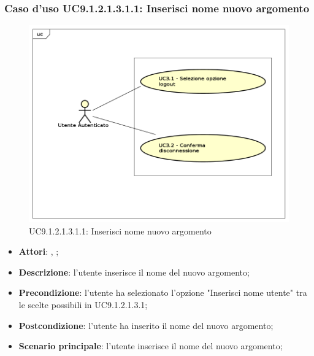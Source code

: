 							\subsubsection{Caso d'uso UC9.1.2.1.3.1.1: Inserisci nome nuovo argomento}
							\label{UC9.1.2.1.3.1.1}
							\begin{figure}[h]
								\centering
								\includegraphics[scale=0.7,keepaspectratio]{UML/UC9.png}
								\caption{UC9.1.2.1.3.1.1: Inserisci nome nuovo argomento}
							\end{figure}
							\FloatBarrier
							\begin{itemize}
								\item \textbf{Attori}: \uau, \uaupro;
								\item \textbf{Descrizione}: l'utente inserisce il nome del nuovo argomento;
								\item \textbf{Precondizione}: l'utente ha selezionato l'opzione "Inserisci nome utente" tra le scelte possibili in UC9.1.2.1.3.1;
								\item \textbf{Postcondizione}: l'utente ha inserito il nome del nuovo argomento;
								\item \textbf{Scenario principale}: l'utente inserisce il nome del nuovo argomento;
							\end{itemize}
							
